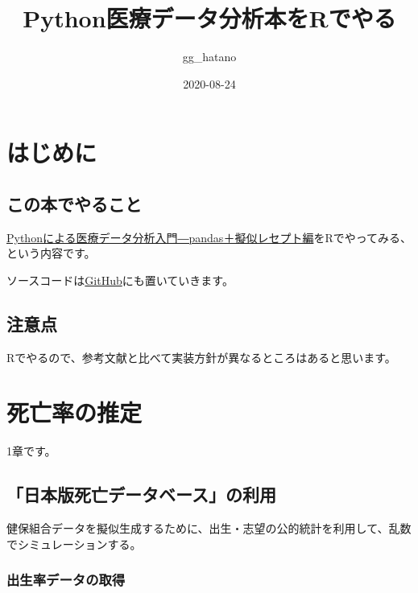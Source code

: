 \documentclass[
]{book}
\title{Python医療データ分析本をRでやる}
\author{gg\_hatano}
\date{2020-08-24}
\begin{document}
\maketitle

{
\setcounter{tocdepth}{1}
\tableofcontents
}
\hypertarget{ux306fux3058ux3081ux306b}{%
\chapter{はじめに}\label{ux306fux3058ux3081ux306b}}

\hypertarget{ux3053ux306eux672cux3067ux3084ux308bux3053ux3068}{%
\section{この本でやること}\label{ux3053ux306eux672cux3067ux3084ux308bux3053ux3068}}

\href{https://gihyo.jp/book/2020/978-4-297-11517-3}{Pythonによる医療データ分析入門―pandas＋擬似レセプト編}をRでやってみる、という内容です。

ソースコードは\href{https://github.com/gghatano/python_synthetic_medical_data}{GitHub}にも置いていきます。

\hypertarget{ux6ce8ux610fux70b9}{%
\section{注意点}\label{ux6ce8ux610fux70b9}}

Rでやるので、参考文献と比べて実装方針が異なるところはあると思います。

\hypertarget{ux6b7bux4ea1ux7387ux306eux63a8ux5b9a}{%
\chapter{死亡率の推定}\label{ux6b7bux4ea1ux7387ux306eux63a8ux5b9a}}

1章です。

\hypertarget{ux65e5ux672cux7248ux6b7bux4ea1ux30c7ux30fcux30bfux30d9ux30fcux30b9ux306eux5229ux7528}{%
\section{「日本版死亡データベース」の利用}\label{ux65e5ux672cux7248ux6b7bux4ea1ux30c7ux30fcux30bfux30d9ux30fcux30b9ux306eux5229ux7528}}

健保組合データを擬似生成するために、出生・志望の公的統計を利用して、乱数でシミュレーションする。

\hypertarget{ux51faux751fux7387ux30c7ux30fcux30bfux306eux53d6ux5f97}{%
\subsection{出生率データの取得}\label{ux51faux751fux7387ux30c7ux30fcux30bfux306eux53d6ux5f97}}
\end{document}
